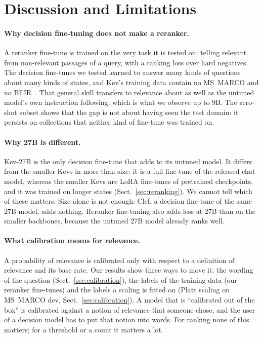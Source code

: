 \section{Discussion and Limitations}
\label{sec:discussion}

\paragraph{Why decision fine-tuning does not make a reranker.}
A reranker fine-tune is trained on the very task it is tested on: telling relevant from non-relevant passages of a
query, with a ranking loss over hard negatives. The decision fine-tunes we tested learned to answer many kinds of
questions about many kinds of states, and Kev's training data contain no MS~MARCO and no BEIR~\cite{KevCards}. That
general skill transfers to relevance about as well as the untuned model's own instruction following, which is what we
observe up to 9B. The zero-shot subset shows that the gap is not about having seen the test domain: it persists on
collections that neither kind of fine-tune was trained on.

\paragraph{Why 27B is different.}
Kev-27B is the only decision fine-tune that adds to its untuned model. It differs from the smaller Kevs in more than
size: it is a full fine-tune of the released chat model, whereas the smaller Kevs are LoRA fine-tunes of pretrained
checkpoints, and it was trained on longer states (Sect.~\ref{sec:reranking}). We cannot tell which of these matters.
Size alone is not enough: Clef, a decision fine-tune of the same 27B model, adds nothing. Reranker fine-tuning also
adds less at 27B than on the smaller backbones, because the untuned 27B model already ranks well.

\paragraph{What calibration means for relevance.}
A probability of relevance is calibrated only with respect to a definition of relevance and its base rate. Our
results show three ways to move it: the wording of the question (Sect.~\ref{sec:calibration}), the labels of the
training data (our reranker fine-tunes) and the labels a scaling is fitted on (Platt scaling on MS~MARCO dev,
Sect.~\ref{sec:calibration}). A model that is ``calibrated out of the box'' is calibrated against a notion of
relevance that someone chose, and the user of a decision model has to put that notion into words. For ranking none of
this matters; for a threshold or a count it matters a lot.

